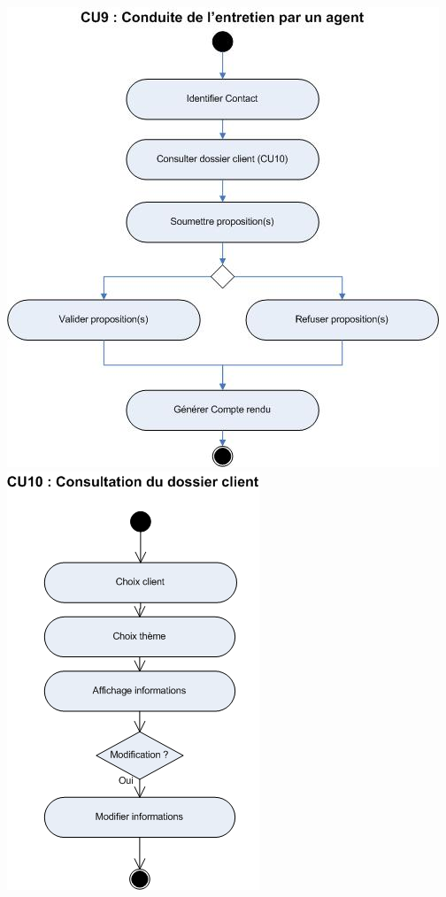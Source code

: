 \begin {center}
\includegraphics{../../diagrammeActivite/DACU9.jpg}
\includegraphics{../../diagrammeActivite/DACU10.png}
\end {center}

